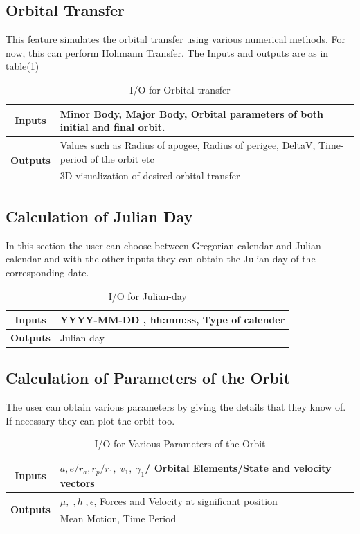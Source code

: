 \documentclass[12pt]{article}
\begin{document}
\subsection{Orbital Transfer}
This feature simulates the orbital transfer using various numerical methods. For now, this can perform Hohmann Transfer. The Inputs and outputs are as in table(\ref{tab:ot})
\begin{table}[H]
\centering
\begin{tabular}{@{}cl@{}}
\toprule
\multicolumn{1}{c}{\textbf{Inputs}} & Minor Body, Major Body, Orbital parameters of both initial and final orbit.                     \\ \midrule
\multirow{2}{*}{\textbf{Outputs}}   & Values such as Radius of apogee, Radius of perigee, DeltaV, Time-period of the orbit etc \\ \cmidrule(l){2-2} 
                           & 3D visualization of desired orbital transfer \\ \bottomrule
\end{tabular}
\caption{I/O for Orbital transfer}
\label{tab:ot}
\end{table}
\subsection{Calculation of Julian Day}
In this section the user can choose between Gregorian calendar and Julian calendar and with the other inputs they can obtain the Julian day of the corresponding date. 
\begin{table}[H]
\centering
\begin{tabular}{@{}cl@{}}
\toprule
\textbf{Inputs}  & YYYY-MM-DD , hh:mm:ss, Type of calender \\ \midrule
\textbf{Outputs} & Julian-day  \\ \bottomrule                                              
\end{tabular}
\caption{I/O for Julian-day}
\label{tab:jd}
\end{table}
\subsection{Calculation of Parameters of the Orbit}
The user can obtain various parameters by giving the details that they know of. If necessary they can plot the orbit too.
\begin{table}[H]
\centering
\begin{tabular}{@{}rl@{}}
\toprule
\multicolumn{1}{c}{\textbf{Inputs}} & $a,e/r_a, r_p/r_1,\;v_1,\;\gamma_1$/ Orbital Elements/State and velocity vectors \\ \midrule
\multirow{2}{*}{\textbf{Outputs}}   & $\mu,\;,h\;,\epsilon$, Forces and Velocity at significant position               \\ \cmidrule(l){2-2} 
                           & Mean Motion, Time Period                                                         \\ \bottomrule
\end{tabular}
\caption{I/O for Various Parameters of the Orbit}
\label{vpco}
\end{table}
\end{document}
